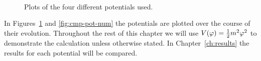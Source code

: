 \begin{figure}[htbp]
\centering%
\qquad%
\\%
\qquad%
\caption[Different potentials used]{Plots of the four different potentials used.}
\label{fig:potentials-num}
\end{figure}
% 
% 
In Figures~\ref{fig:potentials-num} and \ref{fig:cmp-pot-num} the potentials are
plotted over the course of their evolution. Throughout the rest of this
chapter we will use $V(\varphi)=\frac{1}{2} m^2 \varphi^2$ to
demonstrate the calculation unless otherwise stated. In Chapter~\ref{ch:results} the
results for each potential will be compared.



